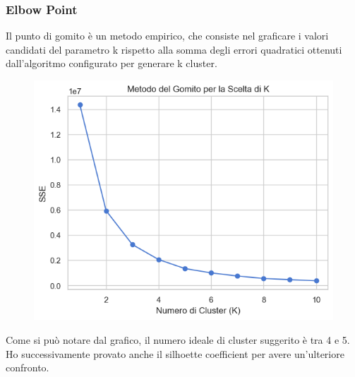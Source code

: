 \documentclass[]{article}
\begin{document}
            \subsubsection{Elbow Point}
                Il punto di gomito è un metodo empirico, che consiste nel graficare i valori candidati del parametro k rispetto alla somma degli errori quadratici ottenuti dall’algoritmo configurato per generare k cluster.
                \begin{figure}[H]
                    \centering
                    \includegraphics[width=0.7\linewidth]{images/elbowPoint.png}
                    \label{fig:enter-label}
                \end{figure}
                Come si può notare dal grafico, il numero ideale di cluster suggerito è tra 4 e 5. Ho successivamente provato anche il silhoette coefficient per avere un'ulteriore confronto.
\end{document}
